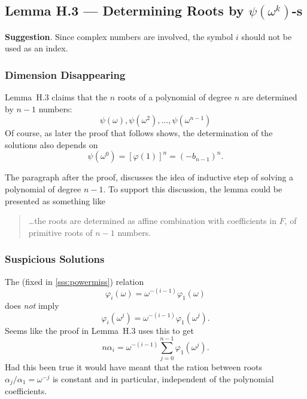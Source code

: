 \subsection{Lemma H.3 --- Determining Roots by \ensuremath{\psi(\omega^k)}-s}

\textbf{Suggestion}. Since complex numbers are involved, the symbol $i$
should not be used as an index.

\subsubsection{Dimension Disappearing}

Lemma~H.3 claims that the $n$ roots of a polynomial
of degree $n$ are determined by \(n - 1\) numbers:
\begin{equation*}
\psi(\omega),
\psi(\omega^2),\ldots,\psi(\omega^{n-1})
\end{equation*}
Of course, as later the proof that follows shows,
the determination of the solutions also depends on
\begin{equation*}
\psi(\omega^0) = [\varphi(1)]^n = (-b_{n-1})^n.
\end{equation*}

The paragraph after the proof, discusses
the idea of inductive step of solving a polynomial of degree \(n-1\).
To support this discussion, the lemma could be
presented as something like
\begin{quotation}
\ldots the roots are determined as affine combination
with coefficients in $F$,
of primitive roots of \(n-1\) numbers.
\end{quotation}

\subsubsection{Suspicious Solutions}

The (fixed in \ref{sss:powermiss}) relation
\begin{equation*}
\varphi_i(\omega) = \omega^{-(i-1)}\varphi_1(\omega)
\end{equation*}
does \emph{not} imply
\begin{equation*}
\varphi_i(\omega^j) = \omega^{-(i-1)}\varphi_1(\omega^j).
\end{equation*}
Seems like the proof in Lemma~H.3 uses this to get
\begin{equation*}
n\alpha_i = \omega^{-(i-1)}\sum_{j=0}^{n-1} \varphi_1(\omega^j).
\end{equation*}
Had this been true it would have meant that
the ration between roots \(\alpha_j/\alpha_1 = \omega^{-j}\)
is constant and in particular, independent of the polynomial coefficients.


